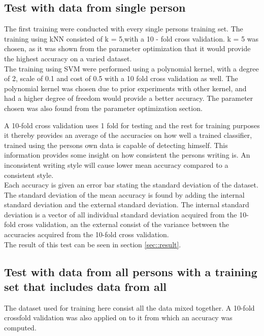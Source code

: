 \subsection{Test with data from single person}
\label{sec::test_with_data_from_single_person}

The first training were conducted with every single persons training set. The 
training using kNN consisted of k = 5,with a 10 - fold cross validation. k = 5 
was chosen, as it was shown from the parameter optimization that it would provide the highest accuracy on a varied dataset. \\

The training using SVM were performed using a polynomial kernel, with a degree 
of 2, scale of 0.1   and cost of 0.5 with a 10 fold cross validation as well. 
The polynomial kernel was chosen due to prior experiments with other kernel, and 
had a higher degree of freedom would provide a better accuracy. The parameter chosen was also found from the parameter optimization section. 

 
A
10-fold cross validation uses 1 fold for testing and the rest for training 
purposes it thereby provides an average of the accuracies on how well a trained 
classifier, trained using the persons own data is capable of detecting himself.  
This information provides some insight on how consistent the persons writing is. 
An inconsistent writing style will cause lower mean accuracy compared to a 
consistent style. \\

Each accuracy is given an error bar stating the standard deviation of the 
dataset. The standard deviation of the mean accuracy is found by adding the 
internal standard deviation and the external standard deviation. The internal 
standard deviation is a vector of all individual standard deviation acquired 
from the 10-fold cross validation, an the external consist of the variance 
between the accuracies acquired  from the 10-fold cross validation. \\
 
The result of this test can be seen in section  \ref{sec::result}. 

\subsection{Test with data from all persons with a training set that includes 
data from all}

The dataset used for training here consist all the data mixed together. A 10-fold crossfold validation was also applied on to it from which an accuracy was computed. 



